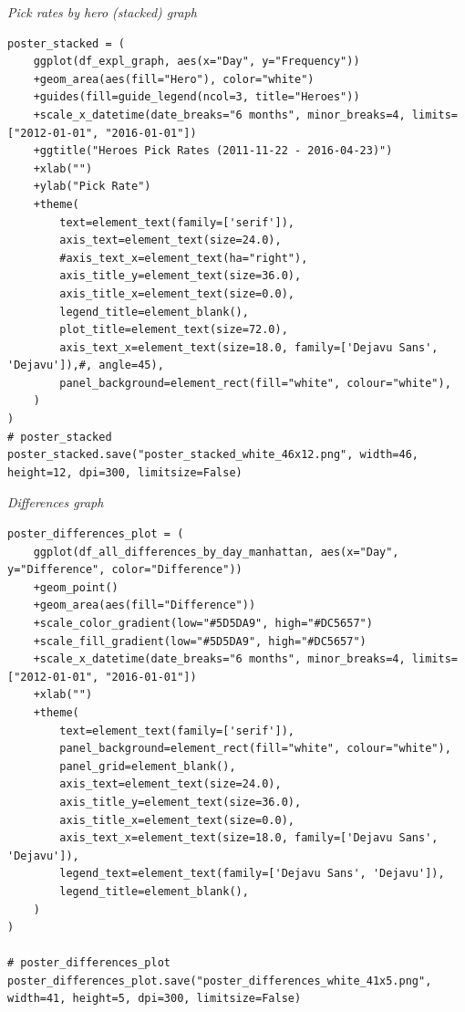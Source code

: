 \emph{Pick rates by hero (stacked) graph}
\begin{verbatim}
poster_stacked = (
    ggplot(df_expl_graph, aes(x="Day", y="Frequency"))
    +geom_area(aes(fill="Hero"), color="white")
    +guides(fill=guide_legend(ncol=3, title="Heroes"))
    +scale_x_datetime(date_breaks="6 months", minor_breaks=4, limits=["2012-01-01", "2016-01-01"])
    +ggtitle("Heroes Pick Rates (2011-11-22 - 2016-04-23)")
    +xlab("")
    +ylab("Pick Rate")
    +theme(
        text=element_text(family=['serif']),
        axis_text=element_text(size=24.0),
        #axis_text_x=element_text(ha="right"),
        axis_title_y=element_text(size=36.0),
        axis_title_x=element_text(size=0.0),
        legend_title=element_blank(),
        plot_title=element_text(size=72.0),
        axis_text_x=element_text(size=18.0, family=['Dejavu Sans', 'Dejavu']),#, angle=45),
        panel_background=element_rect(fill="white", colour="white"),
    )
)
# poster_stacked
poster_stacked.save("poster_stacked_white_46x12.png", width=46, height=12, dpi=300, limitsize=False)
\end{verbatim}

\emph{Differences graph}
\begin{verbatim}
poster_differences_plot = (
    ggplot(df_all_differences_by_day_manhattan, aes(x="Day", y="Difference", color="Difference"))
    +geom_point()
    +geom_area(aes(fill="Difference"))
    +scale_color_gradient(low="#5D5DA9", high="#DC5657")
    +scale_fill_gradient(low="#5D5DA9", high="#DC5657")
    +scale_x_datetime(date_breaks="6 months", minor_breaks=4, limits=["2012-01-01", "2016-01-01"])
    +xlab("")
    +theme(
        text=element_text(family=['serif']),
        panel_background=element_rect(fill="white", colour="white"),
        panel_grid=element_blank(),
        axis_text=element_text(size=24.0),
        axis_title_y=element_text(size=36.0),
        axis_title_x=element_text(size=0.0),
        axis_text_x=element_text(size=18.0, family=['Dejavu Sans', 'Dejavu']),
        legend_text=element_text(family=['Dejavu Sans', 'Dejavu']),
        legend_title=element_blank(),
    )
)

# poster_differences_plot
poster_differences_plot.save("poster_differences_white_41x5.png", width=41, height=5, dpi=300, limitsize=False)
\end{verbatim}

